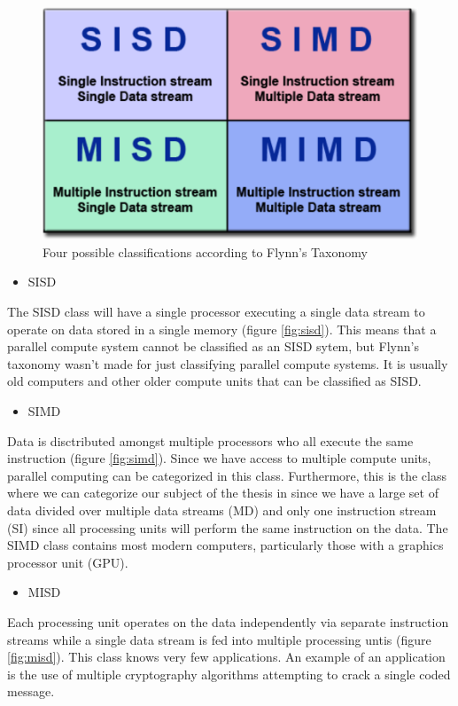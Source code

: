 \documentclass[a4paper, 11pt]{report}
\begin{document}
	\begin{figure}[h]
		\centering
		\includegraphics[scale=.5]{images/flynnsTaxonomy.pdf}
		\caption{Four possible classifications according to Flynn's Taxonomy}
		\label{fig:flynnTaxonomy}
	\end{figure}
	
	\begin{itemize}
		\item SISD
	\end{itemize}
The SISD class will have a single processor executing a single data stream to operate on data stored in a single memory (figure \ref{fig:sisd}). This means that a parallel compute system cannot be classified as an SISD sytem, but Flynn's taxonomy wasn't made for just classifying parallel compute systems. It is usually old computers and other older compute units that can be classified as SISD.
	
	\begin{itemize}
		\item SIMD
	\end{itemize}
Data is disctributed amongst multiple processors who all execute the same instruction (figure \ref{fig:simd}). Since we have access to multiple compute units, parallel computing can be categorized in this class. Furthermore, this is the class where we can categorize our subject of the thesis in since we have a large set of data divided over multiple data streams (MD) and only one instruction stream (SI) since all processing units will perform the same instruction on the data. The SIMD class contains most modern computers, particularly those with a graphics processor unit (GPU).

	\begin{itemize}
		\item MISD
	\end{itemize}
Each processing unit operates on the data independently via separate instruction streams while a single data stream is fed into multiple processing untis (figure \ref{fig:misd}). This class knows very few applications. An example of an application is the use of multiple cryptography algorithms attempting to crack a single coded message.
	
\end{document}
